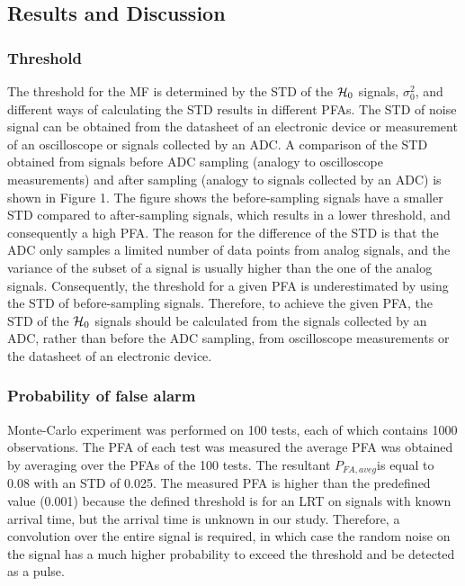 \subsection{Results and Discussion}
\subsubsection{Threshold}
The threshold for the MF is determined by the STD of the $\operatorname*{\mathcal{H}_0}$ signals, $\sigma^2_0$, and different ways of calculating the STD results in different PFAs. The STD of noise signal can be obtained from the datasheet of an electronic device or measurement of an oscilloscope or signals collected by an ADC. A comparison of the STD obtained from signals before ADC sampling (analogy to oscilloscope measurements) and after sampling (analogy to signals collected by an ADC) is shown in Figure 1. The figure shows the before-sampling signals have a smaller STD compared to after-sampling signals, which results in a lower threshold, and consequently a high PFA. The reason for the difference of the STD is that the ADC only samples a limited number of data points from analog signals, and the variance of the subset of a signal is usually higher than the one of the analog signals. Consequently, the threshold for a given PFA is underestimated by using the STD of before-sampling signals. Therefore, to achieve the given PFA, the STD of the $\operatorname*{\mathcal{H}_0}$ signals should be calculated from the signals collected by an ADC, rather than before the ADC sampling, from oscilloscope measurements or the datasheet of an electronic device. 
\subsubsection{Probability of false alarm}
Monte-Carlo experiment was performed on 100 tests, each of which contains 1000 observations. The PFA of each test was measured the average PFA was obtained by averaging over the PFAs of the 100 tests. The resultant $P_{FA,aveg} $is equal to 0.08 with an STD of 0.025. The measured PFA is higher than the predefined value (0.001) because the defined threshold is for an LRT on signals with known arrival time, but the arrival time is unknown in our study. Therefore, a convolution over the entire signal is required, in which case the random noise on the signal has a much higher probability to exceed the threshold and be detected as a pulse.
